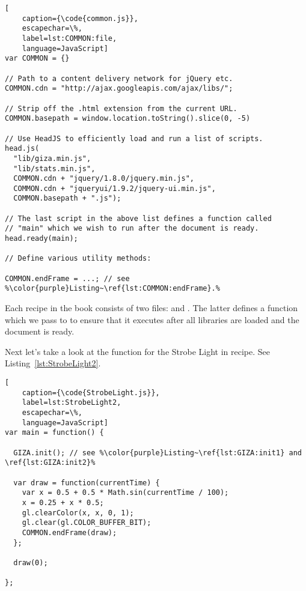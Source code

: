\begin{lstlisting}[
    caption={\code{common.js}},
    escapechar=\%,
    label=lst:COMMON:file,
    language=JavaScript]
var COMMON = {}

// Path to a content delivery network for jQuery etc.
COMMON.cdn = "http://ajax.googleapis.com/ajax/libs/";

// Strip off the .html extension from the current URL.
COMMON.basepath = window.location.toString().slice(0, -5)

// Use HeadJS to efficiently load and run a list of scripts.
head.js(
  "lib/giza.min.js",
  "lib/stats.min.js",
  COMMON.cdn + "jquery/1.8.0/jquery.min.js",
  COMMON.cdn + "jqueryui/1.9.2/jquery-ui.min.js",
  COMMON.basepath + ".js");

// The last script in the above list defines a function called
// "main" which we wish to run after the document is ready.
head.ready(main);

// Define various utility methods:

COMMON.endFrame = ...; // see %\color{purple}Listing~\ref{lst:COMMON:endFrame}.%
\end{lstlisting} 

Each recipe in the book consists of two files:  and .  The latter defines a function  which we pass to  to ensure that it executes after all libraries are loaded and the document is ready.

\begin{comment}
{RecipeName}.js
{RecipeName}.html
common.js
css/style.css
lib/head.load.min.js
lib/giza.min.js
lib/stats.min.js
\end{comment}

Next let's take a look at the  function for the Strobe Light in  recipe.  See Listing~\ref{lst:StrobeLight2}.

\begin{lstlisting}[
    caption={\code{StrobeLight.js}},
    label=lst:StrobeLight2,
    escapechar=\%,
    language=JavaScript]
var main = function() {

  GIZA.init(); // see %\color{purple}Listing~\ref{lst:GIZA:init1} and \ref{lst:GIZA:init2}%

  var draw = function(currentTime) {
    var x = 0.5 + 0.5 * Math.sin(currentTime / 100);
    x = 0.25 + x * 0.5;
    gl.clearColor(x, x, 0, 1);
    gl.clear(gl.COLOR_BUFFER_BIT);
    COMMON.endFrame(draw);
  };

  draw(0);

};
\end{lstlisting} 


